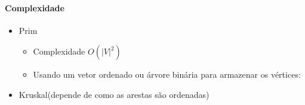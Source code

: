 \begin{frame}
	\framesubtitle{Complexidade}

	\begin{itemize}
		\item Prim\pause
			\begin{itemize}
				\item Complexidade $O(|V|^2)$
				\item Usando um vetor ordenado ou árvore binária para armazenar os vértices:
					\vspace{-1\baselineskip}
			\end{itemize}
		\vfill
		\item Kruskal\pause (depende de como as arestas são ordenadas)
	\end{itemize}
\end{frame}